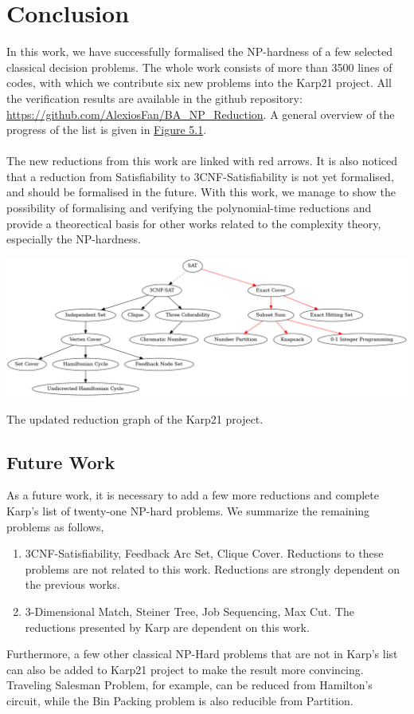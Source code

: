 \chapter{Conclusion}\label{chapter:conclusion}
In this work, we have successfully formalised the NP-hardness of 
a few selected classical decision problems.  
The whole work consists of more than 3500 lines of codes, with which we contribute 
six new problems into the Karp21 project. All the verification results are available in the github repository: 
\url{https://github.com/AlexiosFan/BA_NP_Reduction}. 
A general overview of the progress of the list is given in \hyperref[fig:5.1]{Figure 5.1}.\\\\
The new reductions from this work are linked with red arrows. 
It is also noticed that a reduction from Satisfiability to 3CNF-Satisfiability is not yet
formalised, and should be formalised in the future. With this work,
we manage to show the possibility of formalising and verifying the polynomial-time
reductions and provide a theorectical basis for other works related 
to the complexity theory, especially the NP-hardness. 
\begin{oldfigure}[h!]
\centering 
\includegraphics[angle = 90, scale=0.39]{figures/reductions_new.png}
\caption{The updated reduction graph of the Karp21 project.}
\label{fig:5.1}
\end{oldfigure}

\section*{Future Work}
As a future work, it is necessary to add a few more reductions and complete Karp's 
list of twenty-one NP-hard problems. We summarize the remaining problems as follows,
\begin{enumerate}
    \item 3CNF-Satisfiability, Feedback Arc Set, Clique Cover. Reductions to these problems 
    are not related to this work. Reductions are strongly dependent on the previous works.
    \item 3-Dimensional Match, Steiner Tree, Job Sequencing, Max Cut. The reductions 
    presented by Karp are dependent on this work.
\end{enumerate}
Furthermore, a few other classical NP-Hard problems that are not in Karp's list 
can also be added to Karp21 project to make the result more convincing.
Traveling Salesman Problem, for example, 
can be reduced from Hamilton's circuit, while the Bin Packing problem is also 
reducible from Partition. 
